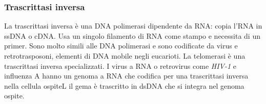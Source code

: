 \subsubsection{Trascrittasi inversa}
La trascrittasi inversa \`e una DNA polimerasi dipendente da RNA: copia l'RNA in ssDNA o cDNA. Usa un singolo filamento di RNA come stampo e necessita di un primer. Sono molto simili
alle DNA polimerasi e sono codificate da virus e retrotrasposoni, elementi di DNA mobile negli eucarioti. La telomerasi \`e una trascrittasi inversa specializzati. I virus a RNA
o retrovirus come \emph{HIV-1} e influenza A hanno un genoma a RNA che codifica per una trascrittasi inversa nella cellula ospiteL il gema \`e trascritto in dsDNA che si integra 
nel genoma ospite. 

